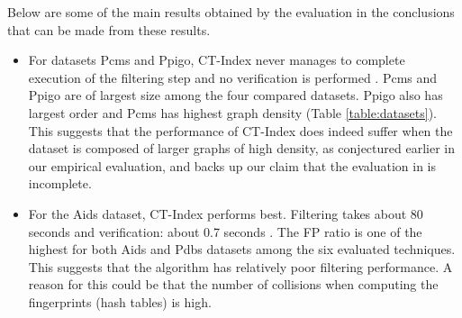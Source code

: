 \documentclass{l4proj}
\begin{document}
Below are some of the main results obtained by the evaluation in \cite{foteini} the conclusions that can be made from these results.
\begin{itemize}
\item For datasets Pcms and Ppigo, CT-Index never manages to complete execution of the filtering step and no verification is performed \cite{foteini}. Pcms and Ppigo are of largest size among the four compared datasets. Ppigo also has largest order and Pcms has highest graph density (Table \ref{table:datasets}). This suggests that the performance of CT-Index does indeed suffer when the dataset is composed of larger graphs of high density, as conjectured earlier in our empirical evaluation, and backs up our claim that the evaluation in \cite{ctindex} is incomplete.
\item For the Aids dataset, CT-Index performs best. Filtering takes about 80 seconds and verification: about 0.7 seconds \cite{foteini}. The FP ratio is one of the highest for both Aids and Pdbs datasets among the six evaluated techniques. This suggests that the algorithm has relatively poor filtering performance. A reason for this could be that the number of collisions when computing the fingerprints (hash tables) is high.
\end{itemize}
\end{document}
